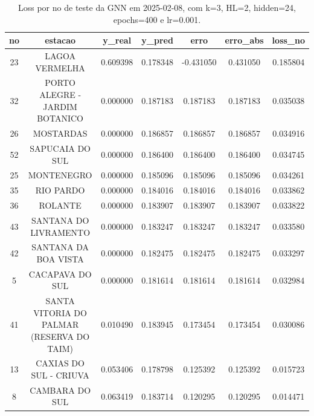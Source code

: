 \begin{table}[h]
\centering
\caption{Loss por no de teste da GNN em 2025-02-08, com k=3, HL=2, hidden=24, epochs=400 e lr=0.001.}
\label{tab:gnn_loss_k3_hl2_h24_e400_d20250208}
\begin{tabular}{ccccccc}
\toprule
no & estacao & y\_real & y\_pred & erro & erro\_abs & loss\_no \\
\midrule
23 & LAGOA VERMELHA & 0.609398 & 0.178348 & -0.431050 & 0.431050 & 0.185804 \\
32 & PORTO ALEGRE - JARDIM BOTANICO & 0.000000 & 0.187183 & 0.187183 & 0.187183 & 0.035038 \\
26 & MOSTARDAS & 0.000000 & 0.186857 & 0.186857 & 0.186857 & 0.034916 \\
52 & SAPUCAIA DO SUL & 0.000000 & 0.186400 & 0.186400 & 0.186400 & 0.034745 \\
25 & MONTENEGRO & 0.000000 & 0.185096 & 0.185096 & 0.185096 & 0.034261 \\
35 & RIO PARDO & 0.000000 & 0.184016 & 0.184016 & 0.184016 & 0.033862 \\
36 & ROLANTE & 0.000000 & 0.183907 & 0.183907 & 0.183907 & 0.033822 \\
43 & SANTANA DO LIVRAMENTO & 0.000000 & 0.183247 & 0.183247 & 0.183247 & 0.033580 \\
42 & SANTANA DA BOA VISTA & 0.000000 & 0.182475 & 0.182475 & 0.182475 & 0.033297 \\
5 & CACAPAVA DO SUL & 0.000000 & 0.181614 & 0.181614 & 0.181614 & 0.032984 \\
41 & SANTA VITORIA DO PALMAR (RESERVA DO TAIM) & 0.010490 & 0.183945 & 0.173454 & 0.173454 & 0.030086 \\
13 & CAXIAS DO SUL - CRIUVA & 0.053406 & 0.178798 & 0.125392 & 0.125392 & 0.015723 \\
8 & CAMBARA DO SUL & 0.063419 & 0.183714 & 0.120295 & 0.120295 & 0.014471 \\
\bottomrule
\end{tabular}
\end{table}
